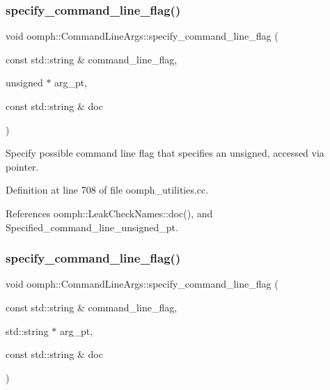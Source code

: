 \subsubsection{\texorpdfstring{specify\+\_\+command\+\_\+line\+\_\+flag()}{specify\_command\_line\_flag()}\hspace{0.1cm}{\footnotesize\ttfamily [4/5]}}
{\footnotesize\ttfamily void oomph\+::\+Command\+Line\+Args\+::specify\+\_\+command\+\_\+line\+\_\+flag (\begin{DoxyParamCaption}\item[{const std\+::string \&}]{command\+\_\+line\+\_\+flag,  }\item[{unsigned $\ast$}]{arg\+\_\+pt,  }\item[{const std\+::string \&}]{doc }\end{DoxyParamCaption})}



Specify possible command line flag that specifies an unsigned, accessed via pointer. 



Definition at line 708 of file oomph\+\_\+utilities.\+cc.



References oomph\+::\+Leak\+Check\+Names\+::doc(), and Specified\+\_\+command\+\_\+line\+\_\+unsigned\+\_\+pt.

\mbox{\label{namespaceoomph_1_1CommandLineArgs_aa5204d492af173835b5f178dcf1fffca}} 
\subsubsection{\texorpdfstring{specify\+\_\+command\+\_\+line\+\_\+flag()}{specify\_command\_line\_flag()}\hspace{0.1cm}{\footnotesize\ttfamily [5/5]}}
{\footnotesize\ttfamily void oomph\+::\+Command\+Line\+Args\+::specify\+\_\+command\+\_\+line\+\_\+flag (\begin{DoxyParamCaption}\item[{const std\+::string \&}]{command\+\_\+line\+\_\+flag,  }\item[{std\+::string $\ast$}]{arg\+\_\+pt,  }\item[{const std\+::string \&}]{doc }\end{DoxyParamCaption})}



